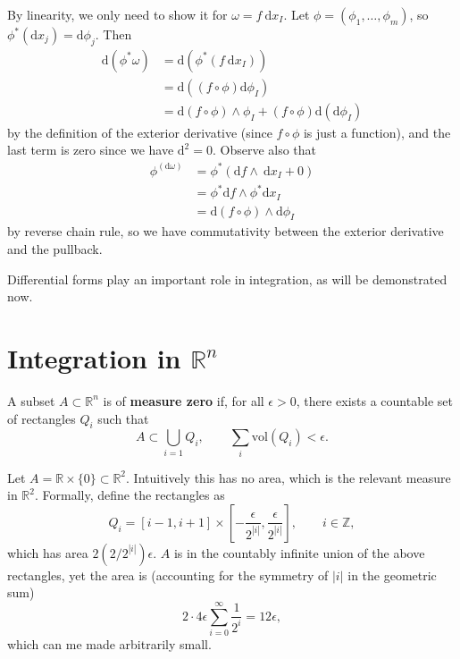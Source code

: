 \documentclass[letter-paper]{tufte-book}
\newenvironment{proof}[1][Proof]{\begin{trivlist}
\item[\hskip \labelsep {\bfseries #1}]}{\end{trivlist}}
\newenvironment{example}[1][Example]{\begin{trivlist}
\item[\hskip \labelsep {\bfseries #1}]}{\end{trivlist}}
\begin{document}
\begin{proof}
  By linearity, we only need to show it for $\omega = f\ \mathrm{d}x_I$. Let $\phi = (\phi_1, \ldots, \phi_m)$, so $\phi^*(\mathrm{d}x_j) = \mathrm{d}\phi_j$. Then
  \begin{align*}
    \mathrm{d}(\phi^*\omega) 
      &= \mathrm{d}(\phi^*(f\ \mathrm{d}x_I))\\
      &= \mathrm{d}((f\circ\phi) \mathrm{d}\phi_I)\\
      &= \mathrm{d}(f\circ\phi)\wedge \phi_I + (f\circ\phi) \mathrm{d}(\mathrm{d}\phi_I)
  \end{align*}
  by the definition of the exterior derivative (since $f\circ\phi$ is just a function), and the last term is zero since we have $\mathrm{d}^2=0$. Observe also that
  \begin{align*}
    \phi^(\mathrm{d}\omega) 
      &= \phi^*(\mathrm{d}f\wedge\ \mathrm{d}x_I + 0)\\
      &= \phi^*\mathrm{d}f \wedge \phi^*\mathrm{d}x_I\\
      &= \mathrm{d}(f\circ\phi) \wedge \mathrm{d}\phi_I
  \end{align*}
  by reverse chain rule, so we have commutativity between the exterior derivative and the pullback.
\end{proof}

Differential forms play an important role in integration, as will be demonstrated now.


\section{Integration in $\mathbb{R}^n$}

A subset $A \subset \mathbb{R}^n$ is of \textbf{measure zero} if, for all $\epsilon > 0$, there exists a countable set of rectangles $Q_i$ such that
\begin{equation*}
  A \subset \bigcup_{i=1} Q_i, \qquad \sum_i \mbox{vol}(Q_i) < \epsilon.
\end{equation*}

\begin{example}
  Let $A = \mathbb{R} \times \{0\} \subset \mathbb{R}^2$. Intuitively this has no area, which is the relevant measure in $\mathbb{R}^2$. Formally, define the rectangles as
  \begin{equation*}
    Q_i = [i-1, i+1] \times \left[-\frac{\epsilon}{2^{|i|}}, \frac{\epsilon}{2^{|i|}}\right], \qquad i\in \mathbb{Z},
  \end{equation*}
  which has area $2(2/2^{|i|})\epsilon$. $A$ is in the countably infinite union of the above rectangles, yet the area is (accounting for the symmetry of $|i|$ in the geometric sum)
  \begin{equation*}
    2\cdot 4 \epsilon \sum_{i=0}^\infty \frac{1}{2^i} = 12\epsilon,
  \end{equation*}
  which can me made arbitrarily small.
\end{example}
\end{document}
